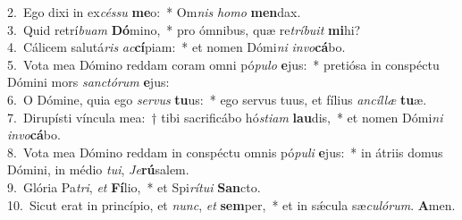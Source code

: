 {2.~}Ego dixi in ex\textit{cés}\textit{su} \textbf{me}o:~* Om\textit{nis} \textit{ho}\textit{mo} \textbf{men}dax.\\
{3.~}Quid retrí\textit{bu}\textit{am} \textbf{Dó}mino,~* pro ómnibus, quæ re\textit{trí}\textit{bu}\textit{it} \textbf{mi}hi?\\
{4.~}Cálicem salutá\textit{ris} \textit{ac}\textbf{cí}piam:~* et nomen Dómi\textit{ni} \textit{in}\textit{vo}\textbf{cá}bo.\\
{5.~}Vota mea Dómino reddam coram omni pó\textit{pu}\textit{lo} \textbf{e}jus:~* pretiósa in conspéctu Dómini mors \textit{san}\textit{ctó}\textit{rum} \textbf{e}jus:\\
{6.~}O Dómine, quia ego \textit{ser}\textit{vus} \textbf{tu}us:~* ego servus tuus, et fílius \textit{an}\textit{cíl}\textit{læ} \textbf{tu}æ.\\
{7.~}Dirupísti víncula mea:~† tibi sacrificábo hó\textit{sti}\textit{am} \textbf{lau}dis,~* et nomen Dómi\textit{ni} \textit{in}\textit{vo}\textbf{cá}bo.\\
{8.~}Vota mea Dómino reddam in conspéctu omnis pó\textit{pu}\textit{li} \textbf{e}jus:~* in átriis domus Dómini, in médio \textit{tu}\textit{i}, \textit{Je}\textbf{rú}salem.\\
{9.~}Glória Pa\textit{tri}, \textit{et} \textbf{Fí}lio,~* et Spi\textit{rí}\textit{tu}\textit{i} \textbf{San}cto.\\
{10.~}Sicut erat in princípio, et \textit{nunc}, \textit{et} \textbf{sem}per,~* et in sǽcula sæ\textit{cu}\textit{ló}\textit{rum}. \textbf{A}men.\\
